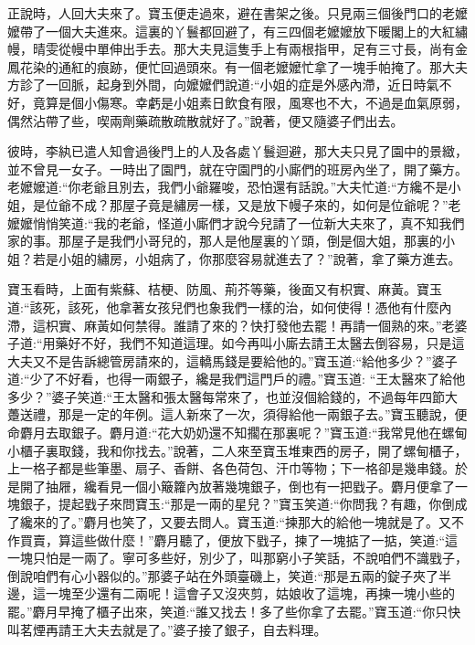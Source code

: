 \begin{parag}
    正說時，人回大夫來了。寶玉便走過來，避在書架之後。只見兩三個後門口的老嬤嬤帶了一個大夫進來。這裏的丫鬟都回避了，有三四個老嬤嬤放下暖閣上的大紅繡幔，晴雯從幔中單伸出手去。那大夫見這隻手上有兩根指甲，足有三寸長，尚有金鳳花染的通紅的痕跡，便忙回過頭來。有一個老嬤嬤忙拿了一塊手帕掩了。那大夫方診了一回脈，起身到外間，向嬤嬤們說道:“小姐的症是外感內滯，近日時氣不好，竟算是個小傷寒。幸虧是小姐素日飲食有限，風寒也不大，不過是血氣原弱，偶然沾帶了些，喫兩劑藥疏散疏散就好了。”說著，便又隨婆子們出去。
\end{parag}


\begin{parag}
    彼時，李紈已遣人知會過後門上的人及各處丫鬟迴避，那大夫只見了園中的景緻，並不曾見一女子。一時出了園門，就在守園門的小廝們的班房內坐了，開了藥方。老嬤嬤道:“你老爺且別去，我們小爺羅唆，恐怕還有話說。”大夫忙道:“方纔不是小姐，是位爺不成？那屋子竟是繡房一樣，又是放下幔子來的，如何是位爺呢？”老嬤嬤悄悄笑道:“我的老爺，怪道小廝們才說今兒請了一位新大夫來了，真不知我們家的事。那屋子是我們小哥兒的，那人是他屋裏的丫頭，倒是個大姐，那裏的小姐？若是小姐的繡房，小姐病了，你那麼容易就進去了？”說著，拿了藥方進去。
\end{parag}


\begin{parag}
    寶玉看時，上面有紫蘇、桔梗、防風、荊芥等藥，後面又有枳實、麻黃。寶玉道:“該死，該死，他拿著女孩兒們也象我們一樣的治，如何使得！憑他有什麼內滯，這枳實、麻黃如何禁得。誰請了來的？快打發他去罷！再請一個熟的來。”老婆子道:“用藥好不好，我們不知道這理。如今再叫小廝去請王太醫去倒容易，只是這大夫又不是告訴總管房請來的，這轎馬錢是要給他的。”寶玉道:“給他多少？”婆子道:“少了不好看，也得一兩銀子，纔是我們這門戶的禮。”寶玉道: “王太醫來了給他多少？”婆子笑道:“王太醫和張太醫每常來了，也並沒個給錢的，不過每年四節大躉送禮，那是一定的年例。這人新來了一次，須得給他一兩銀子去。”寶玉聽說，便命麝月去取銀子。麝月道:“花大奶奶還不知擱在那裏呢？”寶玉道:“我常見他在螺甸小櫃子裏取錢，我和你找去。”說著，二人來至寶玉堆東西的房子，開了螺甸櫃子，上一格子都是些筆墨、扇子、香餅、各色荷包、汗巾等物；下一格卻是幾串錢。於是開了抽屜，纔看見一個小簸籮內放著幾塊銀子，倒也有一把戥子。麝月便拿了一塊銀子，提起戥子來問寶玉:“那是一兩的星兒？”寶玉笑道:“你問我？有趣，你倒成了纔來的了。”麝月也笑了，又要去問人。寶玉道:“揀那大的給他一塊就是了。又不作買賣，算這些做什麼！”麝月聽了，便放下戥子，揀了一塊掂了一掂，笑道:“這一塊只怕是一兩了。寧可多些好，別少了，叫那窮小子笑話，不說咱們不識戥子，倒說咱們有心小器似的。”那婆子站在外頭臺磯上，笑道:“那是五兩的錠子夾了半邊，這一塊至少還有二兩呢！這會子又沒夾剪，姑娘收了這塊，再揀一塊小些的罷。”麝月早掩了櫃子出來，笑道:“誰又找去！多了些你拿了去罷。”寶玉道:“你只快叫茗煙再請王大夫去就是了。”婆子接了銀子，自去料理。
\end{parag}



